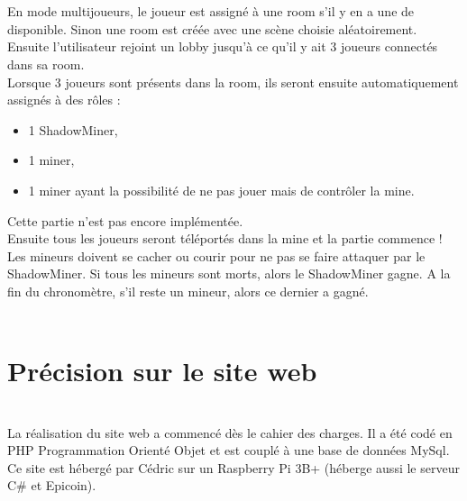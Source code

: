 \documentclass[titlepage, 13px, a4paper]{report}
\begin{document}
\paragraph{} \hspace{0pt} \\
En mode multijoueurs, le joueur est assigné à une room s’il y en a une de disponible.
Sinon une room est créée avec une scène choisie aléatoirement. \\

Ensuite l’utilisateur rejoint un lobby jusqu’à ce qu’il y ait 3 joueurs connectés dans sa room. \\

Lorsque 3 joueurs sont présents dans la room, ils seront ensuite automatiquement assignés à des rôles : \\ 
{\begin{itemize}
	\item 1 ShadowMiner, 
	\item 1 miner,
	\item 1 miner ayant la possibilité de ne pas jouer mais de contrôler la mine. \\ 
\end{itemize}} 

Cette partie n’est pas encore implémentée. \\

Ensuite tous les joueurs seront téléportés dans la mine et la partie commence ! \\
Les mineurs doivent se cacher ou courir pour ne pas se faire attaquer par le ShadowMiner.
Si tous les mineurs sont morts, alors le ShadowMiner gagne.
A la fin du chronomètre, s’il reste un mineur, alors ce dernier a gagné. \\ \\


\section{Précision sur le site web}
\paragraph{} \hspace{0pt} \\
La réalisation du site web a commencé dès le cahier des charges. Il a été codé en PHP Programmation Orienté Objet et 
est couplé à une base de données MySql. \\
Ce site est hébergé par Cédric sur un Raspberry Pi 3B+ (héberge aussi le serveur C\# et Epicoin). \\ \\
\end{document}
